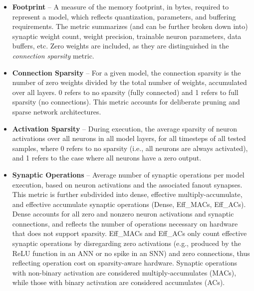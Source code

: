     \begin{itemize}
        \item \textbf{Footprint} -- A measure of the memory footprint, in bytes, required to represent a model, which reflects quantization, parameters, and buffering requirements. The metric summarizes (and can be further broken down into) synaptic weight count, weight precision, trainable neuron parameters, data buffers, etc. Zero weights are included, as they are distinguished in the \textit{connection sparsity} metric. 

        
        \item \textbf{Connection Sparsity} -- %
        For a given model, the connection sparsity is the number of zero weights divided by the total number of weights, accumulated over all layers.
        0 refers to no sparsity (fully connected) and 1 refers to full sparsity (no connections). This metric accounts for deliberate pruning and sparse network architectures. 
        
        \item \textbf{Activation Sparsity} -- During execution, the average sparsity of neuron activations over all neurons in all model layers, for all timesteps of all tested samples, where 0 refers to no sparsity (i.e., all neurons are always activated), and 1 refers to the case where all neurons have a zero output.

        \item \textbf{Synaptic Operations} -- Average number of synaptic operations per model execution, based on neuron activations and the associated fanout synapses.
        This metric is further subdivided into dense, effective multiply-accumulate, and effective accumulate synaptic operations (Dense, Eff\_MACs, Eff\_ACs). Dense accounts for all zero and nonzero neuron activations and synaptic connections, and reflects the number of operations necessary on hardware that does not support sparsity. Eff\_MACs and Eff\_ACs only count effective synaptic operations by disregarding zero activations (e.g., produced by the ReLU function in an ANN or no spike in an SNN) and zero connections, thus reflecting operation cost on sparsity-aware hardware. Synaptic operations with non-binary activation are considered multiply-accumulates (MACs), while those with binary activation are considered accumulates (ACs).
    \end{itemize}

